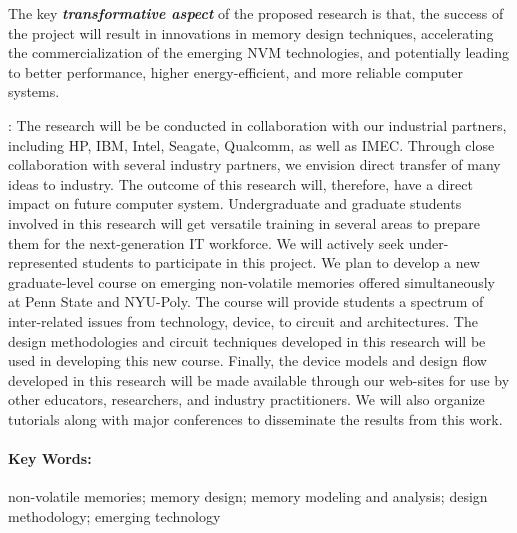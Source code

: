 \documentclass[11pt,letterpaper]{article}
\begin{document}
The key \textit{\textbf{transformative aspect}} of the proposed research is that, the success of the project will result in innovations in memory design techniques, accelerating the commercialization of the emerging NVM technologies, and potentially leading to better performance, higher energy-efficient, and more reliable computer systems.

\vspace*{-2mm} 
{}: The research will be be conducted in collaboration with our industrial partners, including HP, IBM, Intel, Seagate, Qualcomm, as well as IMEC. Through close collaboration with several industry partners, we envision direct transfer of many ideas to industry. The outcome of this research will, therefore, have a direct impact on future computer system. Undergraduate and graduate students involved in this research will get versatile training in several areas to prepare them for the next-generation IT workforce. We will actively seek under-represented students to participate in this project. We plan to develop a new graduate-level course on emerging non-volatile memories offered simultaneously at Penn State and NYU-Poly. The course will provide students a spectrum of inter-related issues from technology, device, to circuit and architectures. The design methodologies and circuit techniques developed in this research will be used in developing this new course. Finally, the device models and design flow developed in this research will be made available through our web-sites for use by other educators, researchers, and industry practitioners. We will also organize tutorials along with major conferences to disseminate the results from this work.

\paragraph{\textbf{Key Words:}} non-volatile memories; memory design; memory modeling and analysis; design methodology; emerging technology
\end{document}

